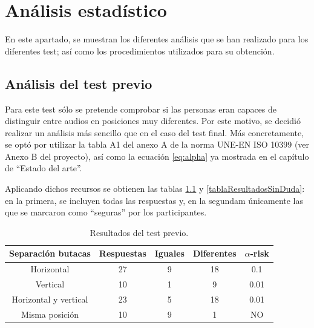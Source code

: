 \documentclass[11pt,a4paper,twoside]{book}
\author{Víctor de Tejada Molera}
\begin{document}
\chapter{Análisis estadístico}    
    
    En este apartado, se muestran los diferentes análisis que se han realizado para los diferentes test; así como los procedimientos utilizados para su obtención.
        
    \section{Análisis del test previo}
        Para este test sólo se pretende comprobar si las personas eran capaces de distinguir entre audios en posiciones muy diferentes. Por este motivo, se decidió realizar un análisis más sencillo que en el caso del test final. Más concretamente, se optó por utilizar la tabla A1 del anexo A de la norma UNE-EN ISO 10399\cite{ISO10399} (ver Anexo B del proyecto), así como la ecuación \ref{eq:alpha} ya mostrada en el capítulo de ``Estado del arte''.
            
        Aplicando dichos recursos se obtienen las tablas \ref{tablaResultadosDuda} y \ref{tablaResultadosSinDuda}: en la primera, se incluyen todas las respuestas y, en la segundam únicamente las que se marcaron como ``seguras'' por los participantes.
            
        \begin{table}[H]
	    \begin{center}
		\begin{scriptsize}
		\begin{tabular}{| c | c | c | c || c |}
			\hline
			\textbf{Separación butacas}&\textbf{Respuestas}&\textbf{Iguales}&\textbf{Diferentes}&\textbf{$\alpha$-risk}\\ \hline
            Horizontal&27&9&18&0.1\\ \hline
            Vertical&10&1&9&0.01\\ \hline
            Horizontal y vertical&23
            &5&18&0.01\\ \hline
            Misma posición&10&9&1&NO\\ \hline
		\end{tabular}
		\caption{Resultados del test previo.}
		\label{tablaResultadosDuda}
		\end{scriptsize}
		\end{center}	
		\end{table}	
		
\end{document}
